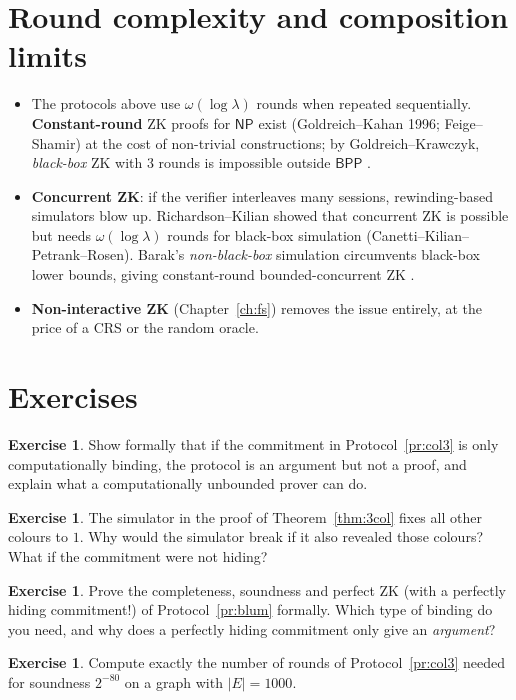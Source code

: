 \documentclass[11pt,a4paper]{report}
\theoremstyle{plain}
\theoremstyle{definition}
\newtheorem{exercise}[theorem]{Exercise}
\theoremstyle{remark}
\newcommand{\NP}{\mathsf{NP}}\newcommand{\BPP}{\mathsf{BPP}}\newcommand{\IP}{\mathsf{IP}}
\begin{document}
\section{Round complexity and composition limits}
\begin{itemize}
\item The protocols above use $\omega(\log\lambda)$ rounds when repeated sequentially. \textbf{Constant-round} ZK proofs for $\NP$ exist (Goldreich--Kahan 1996; Feige--Shamir) at the cost of non-trivial constructions; by Goldreich--Krawczyk, \emph{black-box} ZK with $3$ rounds is impossible outside $\BPP$ \cite{GK96}.
\item \textbf{Concurrent ZK}: if the verifier interleaves many sessions, rewinding-based simulators blow up. Richardson--Kilian showed that concurrent ZK is possible but needs $\omega(\log\lambda)$ rounds for black-box simulation (Canetti--Kilian--Petrank--Rosen). Barak's \emph{non-black-box} simulation circumvents black-box lower bounds, giving constant-round bounded-concurrent ZK \cite{Bar01}.
\item \textbf{Non-interactive ZK} (Chapter~\ref{ch:fs}) removes the issue entirely, at the price of a CRS or the random oracle.
\end{itemize}

\section*{Exercises}
\begin{exercise}
Show formally that if the commitment in Protocol~\ref{pr:col3} is only computationally binding, the protocol is an argument but not a proof, and explain what a computationally unbounded prover can do.
\end{exercise}
\begin{exercise}
The simulator in the proof of Theorem~\ref{thm:3col} fixes all other colours to $1$. Why would the simulator break if it also revealed those colours? What if the commitment were not hiding?
\end{exercise}
\begin{exercise}
Prove the completeness, soundness and perfect ZK (with a perfectly hiding commitment!) of Protocol~\ref{pr:blum} formally. Which type of binding do you need, and why does a perfectly hiding commitment only give an \emph{argument}?
\end{exercise}
\begin{exercise}\label{ex:rounds3col}
Compute exactly the number of rounds of Protocol~\ref{pr:col3} needed for soundness $2^{-80}$ on a graph with $|E|=1000$.
\end{exercise}
\end{document}
